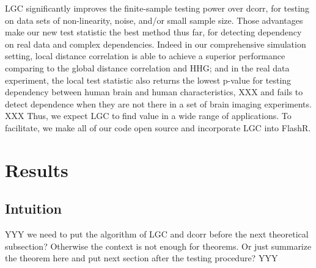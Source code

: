 \documentclass[11pt]{article}
\begin{document}
LGC significantly improves the finite-sample testing power over dcorr, for testing on data sets of non-linearity, noise, and/or small sample size. Those advantages make our new test statistic the best method thus far, for detecting dependency on real data and complex dependencies. Indeed in our comprehensive simulation setting, local distance correlation is able to achieve a superior performance comparing to the global distance correlation and HHG; and in the real data experiment, the local test statistic also returns the lowest p-value for testing dependency between human brain and human characteristics, XXX and fails to detect dependence when they are not there in a set of brain imaging experiments. XXX  Thus, we expect LGC to find value in a wide range of applications.  To facilitate, we make all of our code open source and incorporate LGC into FlashR.




\section{Results}

\subsection{Intuition}

YYY we need to put the algorithm of LGC and dcorr before the next theoretical subsection? Otherwise the context is not enough for theorems. Or just summarize the theorem here and put next section after the testing procedure? YYY
\end{document}
